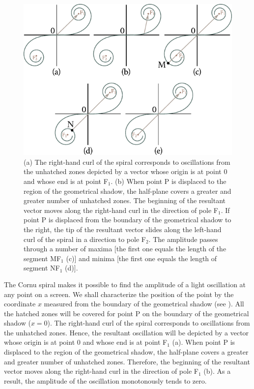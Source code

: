 \begin{figure}[!htb]
	\begin{center}
		\includegraphics[scale=1]{figures/ch_18/fig_18_20.pdf}
        \caption[]{(a) The right-hand curl of the spiral corresponds to oscillations from the unhatched zones depicted by a vector whose origin is at point 0 and whose end is at point F$_1$. (b) When point P is displaced to the region of the geometrical shadow, the half-plane covers a greater and greater number of unhatched zones. The beginning of the resultant vector moves along the right-hand curl in the direction of pole F$_1$. If point P is displaced from the boundary of the geometrical shadow to the right, the tip of the resultant vector slides along the left-hand curl of the spiral in a direction to pole F$_2$. The amplitude passes through a number of maxima [the first one equals the length of the segment MF$_1$ (c)] and minima [the first one equals the length of segment NF$_1$ (d)]. }
		\label{fig:18_20}
	\end{center}
	\vspace{-0.8cm}
\end{figure}

The Cornu spiral makes it possible to find the amplitude of a light oscillation at any point on a screen.
We shall characterize the position of the point by the coordinate $x$ measured from the boundary of the geometrical shadow (see ).
All the hatched zones will be covered for point P on the boundary of the geometrical shadow ($x=0$).
The right-hand curl of the spiral corresponds to oscillations from the unhatched zones.
Hence, the resultant oscillation will be depicted by a vector whose origin is at point $0$ and whose end is at point F$_1$ (a).
When point P is displaced to the region of the geometrical shadow, the half-plane covers a greater and greater number of unhatched zones.
Therefore, the beginning of the resultant vector moves along the right-hand curl in the direction of pole F$_1$ (b).
As a result, the amplitude of the oscillation monotonously tends to zero.

